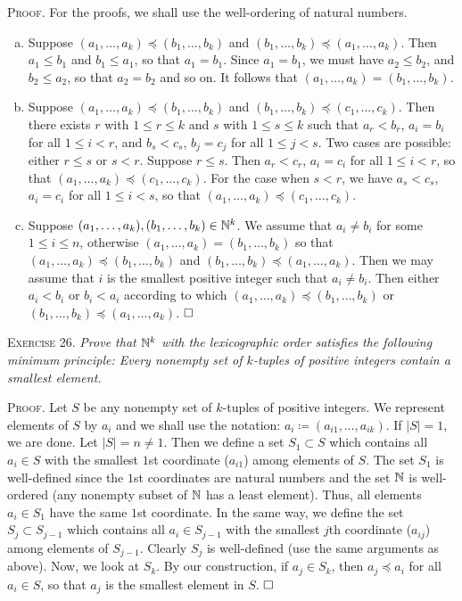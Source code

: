 \documentclass[11pt, leqno]{article}
\newcommand{\done}{\ensuremath{\hfill\square}}
\begin{document}
\textsc{Proof}. For the proofs, we shall use the well-ordering of natural numbers.
\begin{enumerate}[(a)]
\item\label{item:4} Suppose $(a_1,\ldots, a_k) \preceq (b_1,\ldots, b_k)$ and $(b_1,\ldots, b_k) \preceq (a_1, \ldots, a_k)$. Then $a_1 \leq b_1$ and $b_1 \leq a_1$, so that $a_1 = b_1$. Since $a_1 = b_1$, we must have $a_2 \leq b_2$, and $b_2 \leq a_2$, so that $a_2 = b_2$ and so on. It follows that $(a_1,\ldots, a_k) = (b_1, \ldots, b_k)$. 
\item\label{item:5} Suppose $(a_1,\ldots, a_k) \preceq (b_1,\ldots, b_k)$ and $(b_1,\ldots, b_k) \preceq (c_1, \ldots, c_k)$. Then there exists $r$ with $1 \leq r \leq k$ and $s$ with $1 \leq s \leq k$ such that $a_r < b_r$, $a_i = b_i$ for all $1 \leq i < r$, and $b_s < c_s$, $b_j = c_j$ for all $1 \leq j < s$. Two cases are possible: either $r \leq s$ or $s < r$. Suppose $r \leq s$. Then $a_r < c_r$, $a_i = c_i$ for all $1 \leq i < r$, so that $(a_1, \ldots, a_k) \preceq (c_1, \ldots, c_k)$. For the case when $s < r$, we have $a_s < c_s$, $a_i = c_i$ for all $1 \leq i < s$, so that $(a_1, \ldots, a_k) \preceq (c_1, \ldots, c_k)$.
\item\label{item:6} Suppose $(a_1, \ldots, a_k), (b_1, \ldots, b_k) \in \mathbb{N}^k$. We assume that $a_i \ne b_i$ for some $1 \leq i \leq n$, otherwise $(a_1, \ldots, a_k) = (b_1, \ldots, b_k)$ so that $(a_1, \ldots, a_k) \preceq (b_1, \ldots, b_k)$ and $(b_1, \ldots, b_k) \preceq (a_1, \ldots, a_k)$. Then we may assume that $i$ is the smallest positive integer such that $a_i \ne b_i$. Then either $a_i < b_i$ or $b_i < a_i$ according to which $(a_1, \ldots, a_k) \preceq (b_1, \ldots, b_k)$ or $(b_1, \ldots, b_k) \preceq (a_1, \ldots, a_k)$. \done
\end{enumerate}

\textsc{Exercise 26}. \emph{Prove that $\mathbb{N}^k$ with the lexicographic order satisfies the following minimum principle: Every nonempty set of $k$-tuples of positive integers contain a smallest element.}

\textsc{Proof}. Let $S$ be any nonempty set of $k$-tuples of positive integers. We represent elements of $S$ by $a_i$ and we shall use the notation: $a_i \coloneqq (a_{i1}, \ldots, a_{ik})$. If $|S| = 1$, we are done. Let $|S| = n \ne 1$. Then we define a set $S_1 \subset S$ which contains all $a_i \in S$ with the smallest $1$st coordinate ($a_{i1}$) among elements of $S$. The set $S_1$ is well-defined since the $1$st coordinates are natural numbers and the set $\mathbb{N}$ is well-ordered (any nonempty subset of $\mathbb{N}$ has a least element). Thus, all elements $a_i \in S_1$ have the same $1$st coordinate. In the same way, we define the set $S_j \subset S_{j-1}$ which contains all $a_i \in S_{j-1}$ with the smallest $j$th coordinate ($a_{ij}$) among elements of $S_{j-1}$. Clearly $S_j$ is well-defined (use the same arguments as above). Now, we look at $S_k$. By our construction, if $a_j \in S_k$, then $a_j \preceq a_i$ for all $a_i \in S$, so that $a_j$ is the smallest element in $S$. \done
\end{document}
